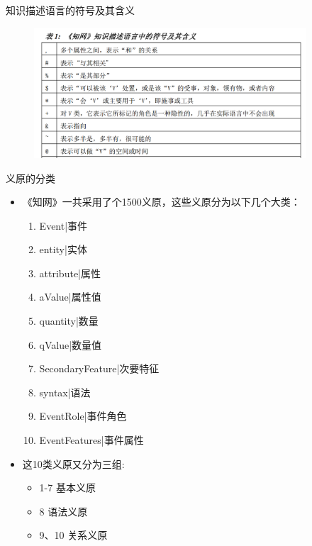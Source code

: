 \documentclass[aspectratio=169]{beamer} %
\begin{document}
    
    \begin{frame}{知识描述语言的符号及其含义}
      \begin{figure}
      \includegraphics[width=4in,height=1.92in]{hownet3.png}
      \end{figure}
    \end{frame}

    \begin{frame}{义原的分类}
      \begin{itemize}
        \item 《知网》一共采用了个1500义原，这些义原分为以下几个大类：
          \begin{enumerate}
            \item Event|事件
            \item entity|实体 
            \item attribute|属性
            \item aValue|属性值
            \item quantity|数量
            \item qValue|数量值 
            \item SecondaryFeature|次要特征
            \item syntax|语法
            \item EventRole|事件角色
            \item EventFeatures|事件属性 
          \end{enumerate}
        \item 这10类义原又分为三组:
          \begin{itemize}
            \item 1-7 基本义原
            \item 8 语法义原
            \item 9、10 关系义原
          \end{itemize}
      \end{itemize}
    \end{frame}
\end{document}
